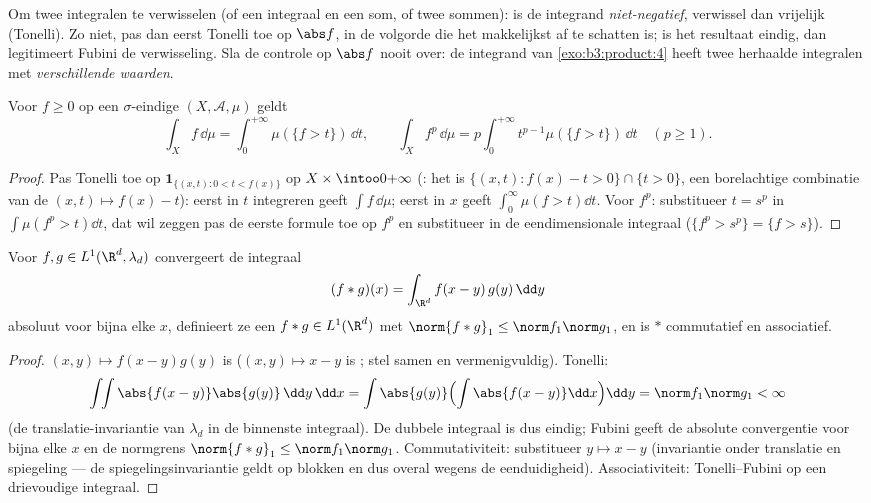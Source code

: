 \begin{method}\label{met:b3:product:fubini}
Om twee integralen te verwisselen (of een integraal en een som, of
twee sommen): is de integrand \emph{niet-negatief}, verwissel dan
vrijelijk (Tonelli). Zo niet, pas dan eerst Tonelli toe op $\abs
f$, in de volgorde die het makkelijkst af te schatten is; is het
resultaat eindig, dan legitimeert Fubini de verwisseling. Sla de
controle op $\abs f$ nooit over: de integrand van
\cref{exo:b3:product:4} heeft twee herhaalde integralen met
\emph{verschillende waarden}.
\end{method}

\begin{proposition}[Laagjesformule]\label{prop:b3:product:layercake}
Voor  $f \geq 0$ op een $\sigma$-eindige $(X, \mathcal A,
\mu)$ geldt
\[
\int_X f\,\dd\mu = \int_0^{+\infty}\mu(\{f > t\})\,\dd t,
\qquad
\int_X f^p\,\dd\mu = p\int_0^{+\infty}t^{p-1}\mu(\{f >
t\})\,\dd t \quad (p \geq 1).
\]
\end{proposition}

\begin{proof}
Pas Tonelli toe op $\mathbf 1_{\{(x,t) : 0 < t < f(x)\}}$ op $X
\times \intoo0{+\infty}$ (: het is $\{(x,t): f(x) - t >
0\}\cap\{t > 0\}$, een borelachtige combinatie van de 
$(x,t)\mapsto f(x) - t$): eerst in $t$ integreren geeft $\int
f\,\dd\mu$; eerst in $x$ geeft $\int_0^\infty\mu(f > t)\dd t$.
Voor $f^p$: substitueer $t = s^p$ in $\int\mu(f^p > t)\dd t$, dat
wil zeggen pas de eerste formule toe op $f^p$ en substitueer in de
eendimensionale integraal ($\{f^p > s^p\} = \{f > s\}$).
\end{proof}

\begin{theorem}[Convolutie op $L^1$]\label{thm:b3:product:convolution}
Voor $f, g \in L^1(\R^d, \lambda_d)$ convergeert de integraal
\[
(f * g)(x) = \int_{\R^d} f(x - y)\,g(y)\,\dd y
\]
absoluut voor bijna elke $x$, definieert ze een $f * g \in
L^1(\R^d)$ met $\norm{f*g}_1 \leq \norm f_1\norm g_1$, en is $*$
commutatief en associatief.
\end{theorem}

\begin{proof}
$(x, y) \mapsto f(x-y)g(y)$ is  ($(x,y)\mapsto x - y$ is
; stel samen en vermenigvuldig). Tonelli:
\[
\int\!\!\int \abs{f(x-y)}\abs{g(y)}\,\dd y\,\dd x
= \int\abs{g(y)}\Bigl(\int\abs{f(x - y)}\dd x\Bigr)\dd y
= \norm f_1\norm g_1 < \infty
\]
(de translatie-invariantie van $\lambda_d$ in de binnenste
integraal). De dubbele integraal is dus eindig; Fubini geeft de
absolute convergentie voor bijna elke $x$ en de normgrens
$\norm{f*g}_1 \leq \norm f_1\norm g_1$. Commutativiteit:
substitueer $y \mapsto x - y$ (invariantie onder translatie en
spiegeling --- de spiegelingsinvariantie geldt op blokken en dus
overal wegens de eenduidigheid). Associativiteit:
Tonelli--Fubini op een drievoudige integraal.
\end{proof}

